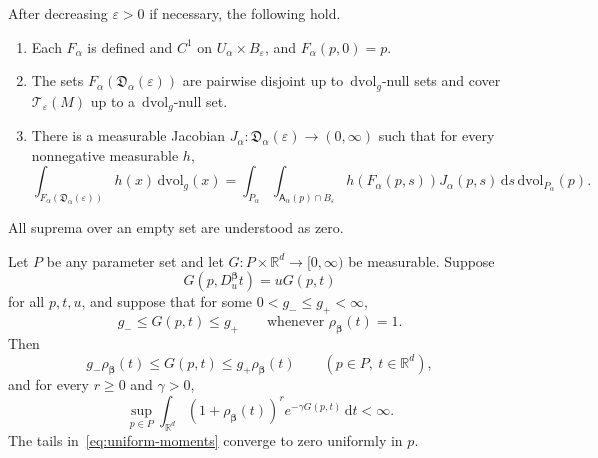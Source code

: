 \documentclass[10pt,a4paper]{amsart}
\newcommand{\Afib}{\mathsf{A}}
\newcommand{\R}{\mathbb{R}}
\newcommand{\cT}{\mathcal{T}}
\newcommand{\dd}{\,\mathrm{d}}
\newcommand{\dvol}{\,\mathrm{dvol}}
\newcommand{\eps}{\varepsilon}
\newcommand{\fD}{\mathfrak{D}}
\begin{document}
\begin{assumption}\label{ass:tube}
After decreasing $\eps>0$ if necessary, the following hold.
\begin{enumerate}[(T1),leftmargin=3em]
\item Each $F_\alpha$ is defined and $C^1$ on $U_\alpha\times B_\eps$, and
  $F_\alpha(p,0)=p$.
\item The sets $F_\alpha(\fD_\alpha(\eps))$ are pairwise disjoint up to
  $\dvol_g$-null sets and cover $\cT_\eps(M)$ up to a $\dvol_g$-null set.
\item There is a measurable Jacobian
  $J_\alpha:\fD_\alpha(\eps)\to(0,\infty)$ such that for every nonnegative
  measurable $h$,
  \begin{equation}\label{eq:cov}
    \int_{F_\alpha(\fD_\alpha(\eps))}h(x)\dvol_g(x)
    =\int_{P_\alpha}\int_{\Afib_\alpha(p)\cap B_\eps}
      h(F_\alpha(p,s))J_\alpha(p,s)\dd s\dvol_{P_\alpha}(p).
  \end{equation}
\end{enumerate}
All suprema over an empty set are understood as zero.
\end{assumption}

\begin{lemma}\label{lem:moments}
Let $P$ be any parameter set and let
$G:P\times\R^d\to[0,\infty)$ be measurable.  Suppose
\begin{equation}\label{eq:G-homogeneous}
  G(p,D_u^{\bm\beta}t)=uG(p,t)
\end{equation}
for all $p,t,u$, and suppose that for some $0<g_-\le g_+<\infty$,
\begin{equation}\label{eq:G-sphere-bounds}
  g_-\le G(p,t)\le g_+
  \qquad\text{whenever }\rho_{\bm\beta}(t)=1.
\end{equation}
Then
\begin{equation}\label{eq:G-gauge-bounds}
  g_-\rho_{\bm\beta}(t)\le G(p,t)\le g_+\rho_{\bm\beta}(t)
  \qquad(p\in P,\ t\in\R^d),
\end{equation}
and for every $r\ge0$ and $\gamma>0$,
\begin{equation}\label{eq:uniform-moments}
  \sup_{p\in P}\int_{\R^d}(1+\rho_{\bm\beta}(t))^r
  e^{-\gamma G(p,t)}\dd t<\infty.
\end{equation}
The tails in~\eqref{eq:uniform-moments} converge to zero uniformly in $p$.
\end{lemma}
\end{document}
